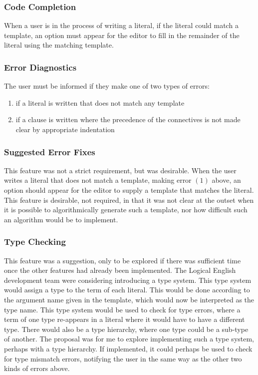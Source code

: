 \documentclass[../main.tex]{subfiles}
\begin{document}
\subsubsection{Code Completion}
When a user is in the process of writing a literal, if the literal could match a template, an option must appear for the editor to fill in the remainder of the literal using the matching template.

\subsubsection{Error Diagnostics}
The user must be informed if they make one of two types of errors:
\begin{enumerate}
    \item if a literal is written that does not match any template 
    \item if a clause is written where the precedence of the connectives is not made clear by appropriate indentation
\end{enumerate}

\subsubsection{Suggested Error Fixes}
This feature was not a strict requirement, but was desirable. When the user writes a literal that does not match a template, making error $(1)$ above, an option should appear for the editor to supply a template that matches the literal. This feature is desirable, not required, in that it was not clear at the outset when it is possible to algorithmically generate such a template, nor how difficult such an algorithm would be to implement.

\subsubsection{Type Checking}
This feature was a suggestion, only to be explored if there was sufficient time once the other features had already been implemented. The Logical English development team were considering introducing a type system. This type system would assign a type to the term of each literal. This would be done according to the argument name given in the template, which would now be interpreted as the type name. This type system would be used to check for type errors, where a term of one type re-appears in a literal where it would have to have a different type. There would also be a type hierarchy, where one type could be a sub-type of another.
The proposal was for me to explore implementing such a type system, perhaps with a type hierarchy. If implemented, it could perhaps be used to check for type mismatch errors, notifying the user in the same way as the other two kinds of errors above. 
\end{document}
